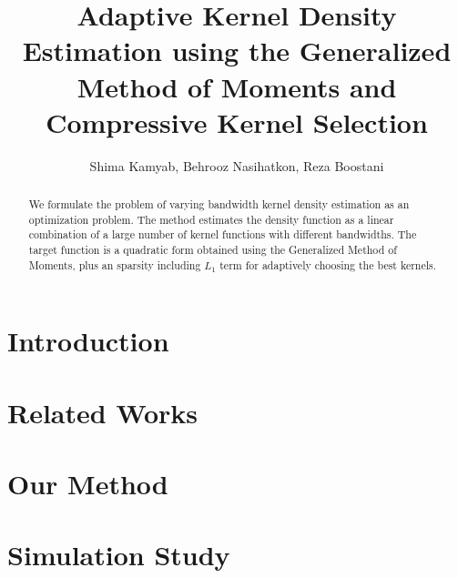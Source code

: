 \documentclass[a4paper]{article}
\title{Adaptive Kernel Density Estimation using the Generalized Method of Moments and Compressive Kernel Selection}
\author{Shima Kamyab, Behrooz Nasihatkon, Reza Boostani}
\begin{document}
\maketitle

\begin{abstract}
We formulate the problem of varying bandwidth kernel density estimation as an optimization problem. The method estimates the density function as a linear combination of a large number of kernel functions with different bandwidths. The target function is a quadratic form obtained using the Generalized Method of Moments, plus an sparsity including $L_1$ term for adaptively choosing the best kernels. 
\end{abstract}

\section{Introduction}


\section{Related Works}
\label{sec:rev}
%

\section{Our Method}
\label{sec:prop}
%



\section{Simulation Study}
\label{sec:sim}

\end{document}
